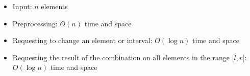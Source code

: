 \begin{itemize}
	\item Input: $n$ elements
	\item Preprocessing: $O(n)$ time and space
	\item Requesting to change an element or interval: $O(\log{n})$ time and space
	\item Requesting the result of the combination on all elements in the range $[l,r[$: $O(\log{n})$ time and space
\end{itemize}
